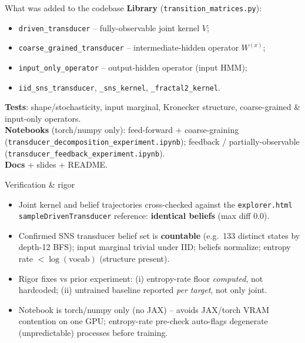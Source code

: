\documentclass[aspectratio=169]{beamer}
\begin{document}
\begin{frame}[fragile]{What was added to the codebase}
\textbf{Library} (\texttt{transition\_matrices.py}):
\begin{itemize}
  \item \verb|driven_transducer| -- fully-observable joint kernel $V$;
  \item \verb|coarse_grained_transducer| -- intermediate-hidden operator $W^{(x)}$;
  \item \verb|input_only_operator| -- output-hidden operator (input HMM);
  \item \verb|iid_sns_transducer|, \verb|_sns_kernel|, \verb|_fractal2_kernel|.
\end{itemize}
\textbf{Tests}: shape/stochasticity, input marginal, Kronecker structure, coarse-grained \&
input-only operators.\\[1mm]
\textbf{Notebooks} (torch/numpy only): feed-forward + coarse-graining
(\texttt{transducer\_decomposition\_experiment.ipynb}); feedback / partially-observable
(\texttt{transducer\_feedback\_experiment.ipynb}).\\[1mm]
\textbf{Docs} + slides + README.
\end{frame}

\begin{frame}{Verification \& rigor}
\begin{itemize}
  \item Joint kernel and belief trajectories cross-checked against the \texttt{explorer.html}
        \texttt{sampleDrivenTransducer} reference: \textbf{identical beliefs} (max diff $0.0$).
  \item Confirmed SNS transducer belief set is \textbf{countable} (e.g.\ 133 distinct states by
        depth-12 BFS); input marginal trivial under IID; beliefs normalize; entropy rate
        $<\log(\text{vocab})$ (structure present).
  \item Rigor fixes vs prior experiment: (i) entropy-rate floor \emph{computed}, not hardcoded;
        (ii) untrained baseline reported \emph{per target}, not only joint.
  \item Notebook is torch/numpy only (no JAX) -- avoids JAX/torch VRAM contention on one GPU;
        entropy-rate pre-check auto-flags degenerate (unpredictable) processes before training.
\end{itemize}
\end{frame}
\end{document}
